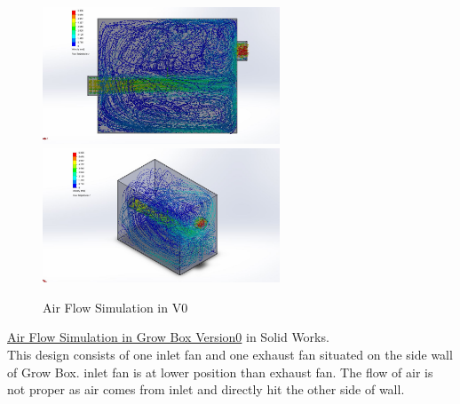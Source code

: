 \documentclass[a4paper,12pt,oneside]{book}
\begin{document}
\begin{figure}[h!]
\includegraphics[width=200pt]{version_0_FV}
\includegraphics[width=200pt]{version_0_ISO}
\caption{Air Flow Simulation in V0}
\end{figure}
\href{https://www.youtube.com/watch?v=nuCj2OUl2X8}{Air Flow Simulation in Grow Box Version0} in Solid Works.\\
This design consists of one inlet fan and one exhaust fan situated on the side wall of Grow Box. inlet fan is at lower position than exhaust fan. The flow of air is not proper as air comes from inlet and directly hit the other side of wall.
\end{document}
